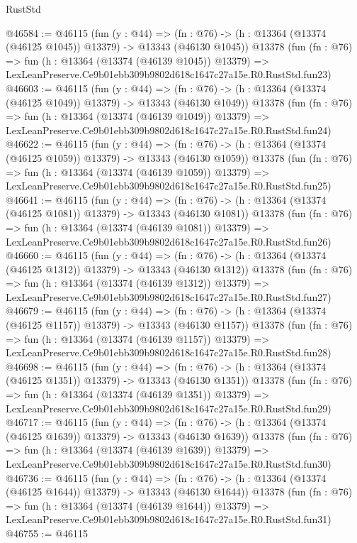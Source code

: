 \begin{lexlean}{RustStd}
\begin{coremodule}
@46584 := @46115
    (fun (y : @44) =>
    (fn : @76) -> (h : @13364 (@13374 (@46125 @1045)) @13379) -> @13343 (@46130 @1045))
    @13378
    (fun (fn : @76) =>
    fun (h : @13364 (@13374 (@46139 @1045)) @13379) =>
    LexLeanPreserve.Ce9b01ebb309b9802d618c1647c27a15e.R0.RustStd.fun23)
@46603 := @46115
    (fun (y : @44) =>
    (fn : @76) -> (h : @13364 (@13374 (@46125 @1049)) @13379) -> @13343 (@46130 @1049))
    @13378
    (fun (fn : @76) =>
    fun (h : @13364 (@13374 (@46139 @1049)) @13379) =>
    LexLeanPreserve.Ce9b01ebb309b9802d618c1647c27a15e.R0.RustStd.fun24)
@46622 := @46115
    (fun (y : @44) =>
    (fn : @76) -> (h : @13364 (@13374 (@46125 @1059)) @13379) -> @13343 (@46130 @1059))
    @13378
    (fun (fn : @76) =>
    fun (h : @13364 (@13374 (@46139 @1059)) @13379) =>
    LexLeanPreserve.Ce9b01ebb309b9802d618c1647c27a15e.R0.RustStd.fun25)
@46641 := @46115
    (fun (y : @44) =>
    (fn : @76) -> (h : @13364 (@13374 (@46125 @1081)) @13379) -> @13343 (@46130 @1081))
    @13378
    (fun (fn : @76) =>
    fun (h : @13364 (@13374 (@46139 @1081)) @13379) =>
    LexLeanPreserve.Ce9b01ebb309b9802d618c1647c27a15e.R0.RustStd.fun26)
@46660 := @46115
    (fun (y : @44) =>
    (fn : @76) -> (h : @13364 (@13374 (@46125 @1312)) @13379) -> @13343 (@46130 @1312))
    @13378
    (fun (fn : @76) =>
    fun (h : @13364 (@13374 (@46139 @1312)) @13379) =>
    LexLeanPreserve.Ce9b01ebb309b9802d618c1647c27a15e.R0.RustStd.fun27)
@46679 := @46115
    (fun (y : @44) =>
    (fn : @76) -> (h : @13364 (@13374 (@46125 @1157)) @13379) -> @13343 (@46130 @1157))
    @13378
    (fun (fn : @76) =>
    fun (h : @13364 (@13374 (@46139 @1157)) @13379) =>
    LexLeanPreserve.Ce9b01ebb309b9802d618c1647c27a15e.R0.RustStd.fun28)
@46698 := @46115
    (fun (y : @44) =>
    (fn : @76) -> (h : @13364 (@13374 (@46125 @1351)) @13379) -> @13343 (@46130 @1351))
    @13378
    (fun (fn : @76) =>
    fun (h : @13364 (@13374 (@46139 @1351)) @13379) =>
    LexLeanPreserve.Ce9b01ebb309b9802d618c1647c27a15e.R0.RustStd.fun29)
@46717 := @46115
    (fun (y : @44) =>
    (fn : @76) -> (h : @13364 (@13374 (@46125 @1639)) @13379) -> @13343 (@46130 @1639))
    @13378
    (fun (fn : @76) =>
    fun (h : @13364 (@13374 (@46139 @1639)) @13379) =>
    LexLeanPreserve.Ce9b01ebb309b9802d618c1647c27a15e.R0.RustStd.fun30)
@46736 := @46115
    (fun (y : @44) =>
    (fn : @76) -> (h : @13364 (@13374 (@46125 @1644)) @13379) -> @13343 (@46130 @1644))
    @13378
    (fun (fn : @76) =>
    fun (h : @13364 (@13374 (@46139 @1644)) @13379) =>
    LexLeanPreserve.Ce9b01ebb309b9802d618c1647c27a15e.R0.RustStd.fun31)
@46755 := @46115

\end{coremodule}
\end{lexlean}

